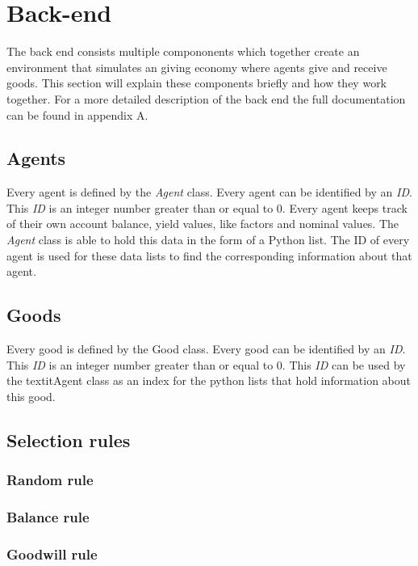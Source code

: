 \documentclass[twoside,openright]{uva-bachelor-thesis}
\begin{document}
\section{Back-end}
The back end consists multiple compononents which together create an environment that simulates an giving economy where agents give and receive goods. This section will explain these components briefly and how they work together. For a more detailed description of the back end the full documentation can be found in appendix A.

\subsection{Agents}
Every agent is defined by the \textit{Agent} class. Every agent can be identified by an \textit{ID}. This \textit{ID} is an integer number greater than or equal to 0. Every agent keeps track of their own account balance, yield values, like factors and nominal values. The \textit{Agent} class is able to hold this data in the form of a Python list. The ID of every agent is used for these data lists to find the corresponding information about that agent.

\subsection{Goods}
Every good is defined by the Good class.  Every good can be identified by an \textit{ID}. This \textit{ID} is an integer number greater than or equal to 0. This \textit{ID} can be used by the textit{Agent} class as an index for the python lists that hold information about this good.

\subsection{Selection rules}

\subsubsection{Random rule}

\subsubsection{Balance rule}

\subsubsection{Goodwill rule}
\end{document}
